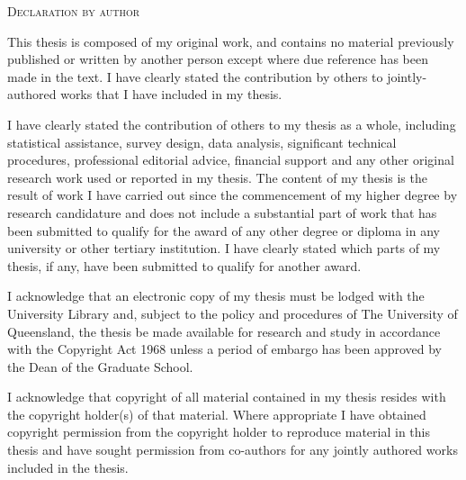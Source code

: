 \thispagestyle{plain}
\newpage
\thispagestyle{plain}
\begin{center}
\Large \textsc{Declaration by author}
\end{center}

\vspace{0.6cm}

This thesis is composed of my original work, and contains no material previously published or written by another person except where due reference has been made in the text. I have clearly stated the contribution by others to jointly-authored works that I have included in my thesis.

\vspace{0.6cm}

I have clearly stated the contribution of others to my thesis as a whole, including statistical assistance, survey design, data analysis, significant technical procedures, professional editorial advice, financial support and any other original research work used or reported in my thesis. The content of my thesis is the result of work I have carried out since the commencement of my higher degree by research candidature and does not include a substantial part of work that has been submitted to qualify for the award of any other degree or diploma in any university or other tertiary institution. I have clearly stated which parts of my thesis, if any, have been submitted to qualify for another award.

\vspace{0.6cm}

I acknowledge that an electronic copy of my thesis must be lodged with the University Library and, subject to the policy and procedures of The University of Queensland, the thesis be made available for research and study in accordance with the Copyright Act 1968 unless a period of embargo has been approved by the Dean of the Graduate School. 

\vspace{0.6cm}

I acknowledge that copyright of all material contained in my thesis resides with the copyright holder(s) of that material. Where appropriate I have obtained copyright permission from the copyright holder to reproduce material in this thesis and have sought permission from co-authors for any jointly authored works included in the thesis.

\afterpage{\null\thispagestyle{empty}\newpage}
\newpage

